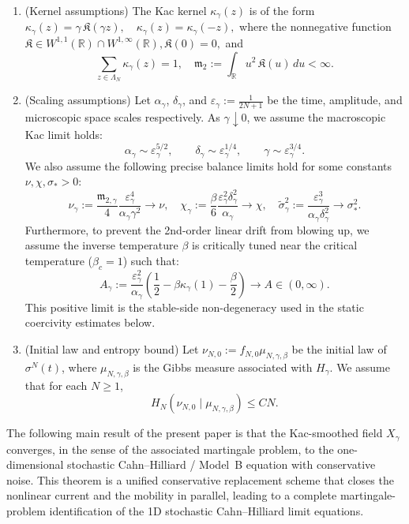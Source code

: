 \documentclass{article}
\begin{document}
\begin{enumerate}
    \item[({\bf A})](Kernel assumptions) The Kac kernel $\kappa_\gamma(z)$ is of the form
\(
\kappa_\gamma(z)=\gamma\,\mathfrak K(\gamma z),
\quad
\kappa_\gamma(z)=\kappa_\gamma(-z), 
\)
where the nonnegative function
\(
\mathfrak K\in W^{1,1}(\mathbb R)\cap W^{1,\infty}(\mathbb R), \mathfrak K(0) = 0,
\)
and
\[
\sum_{z\in\Lambda_N}\kappa_\gamma(z)=1,\quad  \mathfrak m_2:=\int_{\mathbb R}u^2\,\mathfrak K(u)\,du < \infty.
\]
\item[({\bf B})] (Scaling assumptions) Let $\alpha_\gamma$, $\delta_\gamma$, and $\varepsilon_\gamma := \frac{1}{2N+1}$ be the time, amplitude, and microscopic space scales respectively. As $\gamma \downarrow 0$, we assume the macroscopic Kac limit holds:
\[
\alpha_\gamma \sim \varepsilon_\gamma^{5/2},\qquad
\delta_\gamma \sim \varepsilon_\gamma^{1/4},\qquad
\gamma \sim \varepsilon_\gamma^{3/4}.
\]
We also assume the following precise balance limits hold for some constants $\nu, \chi, \sigma_* > 0$:
\[
\nu_\gamma := \frac{\mathfrak m_{2,\gamma}}{4} \frac{\varepsilon_\gamma^4}{\alpha_\gamma\gamma^2} \to \nu, \quad 
\chi_\gamma := \frac{\beta}{6}\frac{\varepsilon_\gamma^2 \delta_\gamma^2}{\alpha_\gamma} \to \chi, \quad 
\widetilde\sigma_\gamma^2 := \frac{\varepsilon_\gamma^3}{\alpha_\gamma\delta_\gamma^2} \to \sigma_*^2.
\]
Furthermore, to prevent the 2nd-order linear drift from blowing up, we assume the inverse temperature $\beta$ is critically tuned near the critical temperature ($\beta_c = 1$) such that:
\[
 A_\gamma := \frac{\varepsilon_\gamma^2}{\alpha_\gamma} \left( \frac12-\beta\kappa_\gamma(1) - \frac{\beta}{2} \right) \to A \in (0,\infty).
\]
This positive limit is the stable-side non-degeneracy used in the static coercivity estimates below.
\item[({\bf C})] (Initial law and entropy bound) 
Let \(\nu_{N,0} := f_{N,0}\mu_{N,\gamma,\beta}\) be the initial law of $\sigma^N(t)$, where \(\mu_{N,\gamma,\beta}\) is the Gibbs measure associated with \(H_\gamma\).
We assume that for each $N \ge 1$,
\[
H_N( \nu_{N,0}\mid \mu_{N,\gamma,\beta})\le C N.
\]
\end{enumerate}

The following main result of the present paper is that the Kac-smoothed field \(X_\gamma\) converges, in the sense of the associated martingale problem, to the one-dimensional stochastic Cahn--Hilliard / Model~B equation with conservative noise. This theorem is a unified conservative replacement scheme that closes the nonlinear current and
the mobility in parallel, leading to a complete martingale-problem identification of the 1D stochastic Cahn--Hilliard limit equations.
\end{document}
